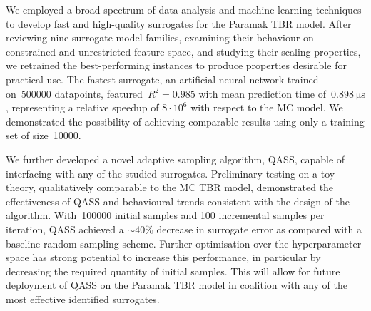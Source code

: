 We employed a broad spectrum of data
analysis and machine learning techniques to develop fast and high-quality
surrogates for the Paramak TBR model. After reviewing
nine surrogate model families, examining their behaviour on constrained and
unrestricted feature space, and studying their scaling properties, we retrained
the best-performing instances to produce properties desirable for
practical use. The fastest surrogate, an artificial neural network trained
on~\num{500000} datapoints, featured~$R^2=\num{0.985}$ with mean prediction time
of~$\SI{0.898}{\micro\second}$, representing a relative
speedup of $8\cdot 10^6$ with respect to the MC model. We demonstrated the possibility of achieving comparable results using only a
training set of size~\num{10000}.

We further developed a novel adaptive
sampling algorithm, QASS, capable of interfacing with any of the studied
surrogates. Preliminary testing on a toy theory, qualitatively comparable to
the MC TBR model, demonstrated the effectiveness of QASS and behavioural trends
consistent with the design of the algorithm. With~\num{100000} initial samples and 100 incremental samples per iteration, QASS achieved a ${\sim}40\%$ decrease in surrogate error as compared with a baseline random sampling scheme. Further optimisation over the hyperparameter space has strong potential to increase this performance, in particular by decreasing the required quantity of initial samples. This will allow for future deployment of QASS on the Paramak TBR model in coalition with any of the most effective identified surrogates.

